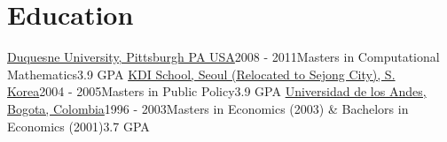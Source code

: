 \section{Education}
\resumeSubHeadingListStart
\resumeSubheading
{\href{https://www.duq.edu/}{Duquesne University, Pittsburgh PA USA}}{2008 - 2011}{Masters in Computational Mathematics}{3.9 GPA}
\resumeSubheading
{\href{https://www.kdischool.ac.kr/}{KDI School, Seoul (Relocated to Sejong City), S. Korea}}{2004 - 2005}{Masters in Public Policy}{3.9 GPA}
\resumeSubheading
{\href{https://uniandes.edu.co/}{Universidad de los Andes, Bogota, Colombia}}{1996 - 2003}{Masters in Economics (2003) \& Bachelors in Economics (2001)}{3.7 GPA}
\resumeSubHeadingListEnd
\vspace{-15pt}

